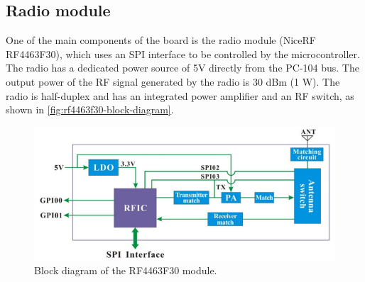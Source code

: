 \subsection{Radio module}

One of the main components of the board is the radio module (NiceRF RF4463F30), which uses an SPI interface to be controlled by the microcontroller. The radio has a dedicated power source of 5V directly from the PC-104 bus. The output power of the RF signal generated by the radio is 30 dBm (1 W). The radio is half-duplex and has an integrated power amplifier and an RF switch, as shown in \autoref{fig:rf4463f30-block-diagram}.

\begin{figure}[!ht]
    \begin{center}
        \includegraphics[width=\textwidth]{figures/rf4463f30-block-diagram.png}
        \caption{Block diagram of the RF4463F30 module.}
        \label{fig:rf4463f30-block-diagram}
    \end{center}
\end{figure}